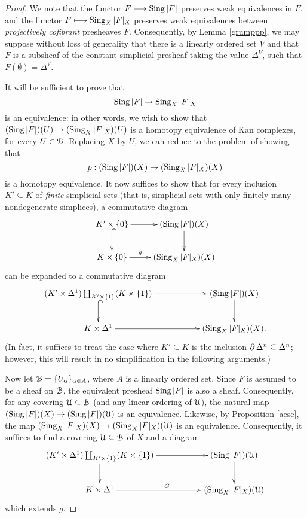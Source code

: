 \begin{proof}
We note that the functor $F \longmapsto \operatorname{Sing} |F|$ preserves weak equivalences in $F$, and the functor $F \longmapsto \operatorname{Sing}_{X} |F|_{X}$ preserves weak equivalences between {\em projectively cofibrant}
presheaves $F$. Consequently, by Lemma \ref{grumppp}, we may suppose without loss of generality that there is a linearly ordered set $V$ and that $F$ is a subsheaf of the constant simplicial presheaf taking the value $\Delta^{V}$, such that $F(\emptyset) = \Delta^V$.

It will be sufficient to prove that
$$\operatorname{Sing} |F| \rightarrow \operatorname{Sing}_{X} |F|_X$$ is an equivalence: in other words, we wish to show that
$(\operatorname{Sing} |F|)(U) \rightarrow (\operatorname{Sing}_{X} |F|_X)(U)$ is a homotopy equivalence of Kan complexes, for every $U \in \operatorname{\mathcal{B}}$. Replacing $X$ by $U$, we can reduce to the problem of showing that
$$ p: (\operatorname{Sing} |F|)(X) \rightarrow (\operatorname{Sing}_X |F|_X)(X)$$
is a homotopy equivalence. 
It now suffices to show that
for every inclusion $K' \subseteq K$ of {\em finite} simplicial sets (that is, simplicial sets with only finitely many nondegenerate simplices), a commutative diagram
$$ \xymatrix{ K' \times \{0\}  \ar@{^{(}->}[d] \ar[r] & (\Sing |F|)(X) \ar[d] \\
K \times \{0\} \ar[r]^-{g} & ( \Sing_{X} |F|_{X} )(X) }$$
can be expanded to a commutative diagram
$$ \xymatrix{ (K' \times \Delta^1) \coprod_{ K' \times \{1\} } (K \times \{1\})  \ar@{^{(}->}[d] \ar[rr] & & (\Sing |F|)(X) \ar[d] \\
K \times \Delta^1 \ar[rr] & & ( \Sing_{X} |F|_{X} )(X). }$$
(In fact, it suffices to treat the case where $K' \subseteq K$ is the inclusion $\operatorname{\partial} \Delta^n \subseteq \Delta^n$; however, this will result in no simplification in the following arguments.) 

Now let $\operatorname{\mathcal{B}} = \{ U_{\alpha} \}_{\alpha \in A}$, where $A$ is a linearly ordered set.
Since $F$ is assumed to be a sheaf on $\operatorname{\mathcal{B}}$, the equivalent presheaf $\operatorname{Sing} |F|$ is also a sheaf. 
Consequently, for any covering $\operatorname{\mathcal{U}} \subseteq \operatorname{\mathcal{B}}$ (and any linear ordering of $\operatorname{\mathcal{U}}$), the natural map $(\operatorname{Sing} |F|)(X) \rightarrow (\operatorname{Sing} |F|)(\operatorname{\mathcal{U}})$ is an equivalence.
Likewise, by Proposition \ref{aese}, the map
$(\operatorname{Sing}_{X} |F|_X)(X) \rightarrow ( \operatorname{Sing}_{X} |F|_X )(\operatorname{\mathcal{U}})$ is an equivalence. Consequently, it suffices to find a covering $\operatorname{\mathcal{U}} \subseteq \operatorname{\mathcal{B}}$ of $X$ and a diagram
$$ \xymatrix{ (K' \times \Delta^1) \coprod_{ K' \times \{1\} } (K \times \{1\})  \ar[d] \ar[rr] & & (\Sing |F|)(\calU) \ar[d] \\
K \times \Delta^1 \ar[rr]^{G} & & ( \Sing_{X} |F|_{X} )(\calU) }$$
which extends $g$.


\end{proof}
